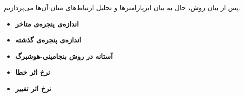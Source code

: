 
پس از بیان روش، حال به بیان ابرپارامترها
و تحلیل ارتباط‌های میان آن‌ها می‌پردازیم.
\begin{itemize}
\item \textbf{
اندازه‌ی پنجره‌ی متاخر
}

\item \textbf{
اندازه‌ی پنجره‌ی گذشته
}

\item \textbf{
آستانه در روش بنجامینی-هوشبرگ
}

\item \textbf{
نرخ اثر خطا
}

\item \textbf{
نرخ اثر تغییر
}
\end{itemize}













































